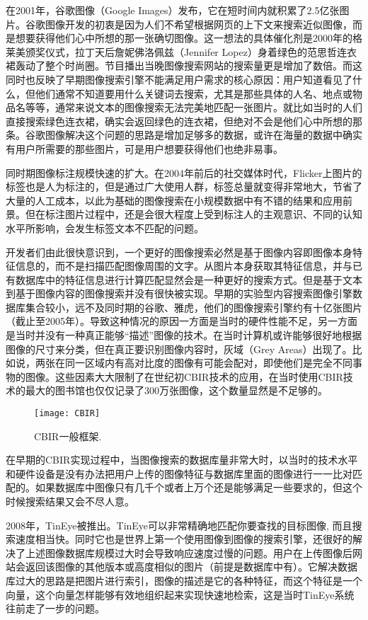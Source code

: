 \documentclass[bachelor_p]{hdu-thesis}
\begin{document}
在2001年，谷歌图像（Google Images）发布，它在短时间内就积累了2.5亿张图片。谷歌图像开发的初衷是因为人们不希望根据网页的上下文来搜索近似图像，而是想要获得他们心中所想的那一张确切图像。这一想法的具体催化剂是2000年的格莱美颁奖仪式，拉丁天后詹妮佛洛佩兹（Jennifer Lopez）身着绿色的范思哲连衣裙轰动了整个时尚圈。节目播出当晚图像搜索网站的搜索量更是增加了数倍。而这同时也反映了早期图像搜索引擎不能满足用户需求的核心原因：用户知道看见了什么，但他们通常不知道要用什么关键词去搜索，尤其是那些具体的人名、地点或物品名等等，通常来说文本的图像搜索无法完美地匹配一张图片。就比如当时的人们直接搜索绿色连衣裙，确实会返回绿色的连衣裙，但绝对不会是他们心中所想的那条。谷歌图像解决这个问题的思路是增加足够多的数据，或许在海量的数据中确实有用户所需要的那些图片，可是用户想要获得他们也绝非易事。

同时期图像标注规模快速的扩大。在2004年前后的社交媒体时代，Flicker上图片的标签也是人为标注的，但是通过广大使用人群，标签总量就变得非常地大，节省了大量的人工成本，以此为基础的图像搜索在小规模数据中有不错的结果和应用前景。但在标注图片过程中，还是会很大程度上受到标注人的主观意识、不同的认知水平所影响，会发生标签文本不匹配的问题。

开发者们由此很快意识到，一个更好的图像搜索必然是基于图像内容即图像本身特征信息的，而不是扫描匹配图像周围的文字。从图片本身获取其特征信息，并与已有数据库中的特征信息进行计算匹配显然会是一种更好的搜索方式。但是基于文本到基于图像内容的图像搜索并没有很快被实现。早期的实验型内容搜索图像引擎数据库集合较小，远不及同时期的谷歌、雅虎，他们的图像搜索引擎约有十亿张图片（截止至2005年）。导致这种情况的原因一方面是当时的硬件性能不足，另一方面是当时并没有一种真正能够“描述”图像的技术。在当时计算机或许能够很好地根据图像的尺寸来分类，但在真正要识别图像内容时，灰域（Grey Areas）出现了。比如说，两张在同一区域内有高对比度的图像有可能会配对，即使他们是完全不同事物的图像。这些因素大大限制了在世纪初CBIR技术的应用，在当时使用CBIR技术的最大的图书馆也仅仅记录了300万张图像，这个数量显然是不足够的。

\begin{figure}[!htb]
  \centering
  \texttt{[image: CBIR]}
  \caption{CBIR一般框架.}
  \label{fig_AltaVista}
\end{figure}

在早期的CBIR实现过程中，当图像搜索的数据库量非常大时，以当时的技术水平和硬件设备是没有办法把用户上传的图像特征与数据库里面的图像进行一一比对匹配的。如果数据库中图像只有几千个或者上万个还是能够满足一些要求的，但这个时候搜索结果又会不尽人意。

2008年，TinEye被推出。TinEye可以非常精确地匹配你要查找的目标图像, 而且搜索速度相当快\citep{TinEye}。同时它也是世界上第一个使用图像到图像的搜索引擎，还很好的解决了上述图像数据库规模过大时会导致响应速度过慢的问题。用户在上传图像后网站会返回该图像的其他版本或高度相似的图片（前提是数据库中有）。它解决数据库过大的思路是把图片进行索引，图像的描述是它的各种特征，而这个特征是一个向量，这个向量怎样能够有效地组织起来实现快速地检索，这是当时TinEye系统往前走了一步的问题。
\end{document}
